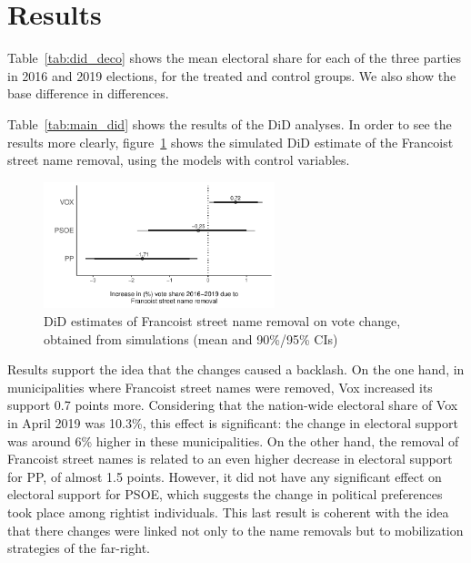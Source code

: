\documentclass[12pt, notitlepage]{article}
\begin{document}
\section*{Results}

Table~\ref{tab:did_deco} shows the mean electoral share for each of the three parties in 2016 and 2019 elections, for the treated and control groups.
We also show the base difference in differences.



Table~\ref{tab:main_did} shows the results of the DiD analyses.
In order to see the results more clearly, figure~\ref{fig:main_did} shows the simulated DiD estimate of the Francoist street name removal, using the models with control variables.



\begin{figure}[htb!]
\centering

  \includegraphics[width = 0.6\textwidth]{img/DiD_estimates}

  \caption{DiD estimates of Francoist street name removal on vote change, obtained from simulations (mean and 90\%/95\% CIs)}\label{fig:main_did}

\end{figure}

Results support the idea that the changes caused a backlash.
On the one hand, in municipalities where Francoist street names were removed, Vox increased its support 0.7 points more.
Considering that the nation-wide electoral share of Vox in April 2019 was 10.3\%, this effect is significant: the change in electoral support was around 6\% higher in these municipalities.
On the other hand, the removal of Francoist street names is related to an even higher decrease in electoral support for PP, of almost 1.5 points.
However, it did not have any significant effect on electoral support for PSOE, which suggests the change in political preferences took place among rightist individuals.
This last result is coherent with the idea that there changes were linked not only to the name removals but to mobilization strategies of the far-right.
\end{document}

